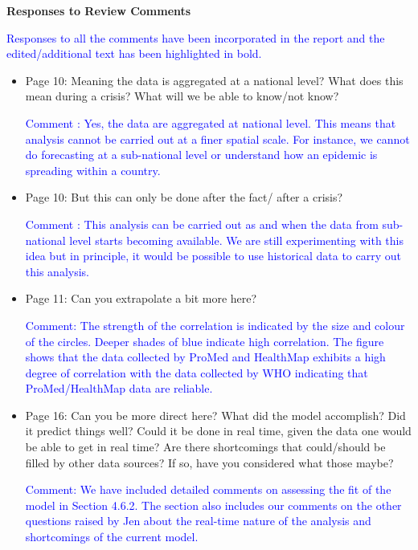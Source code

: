 \documentclass[a4paper,12pt]{article}
\def\sb#1{\textcolor{blue}{#1}}
\begin{document}
\begin{center}
 \textbf{\large Responses to Review Comments}
\end{center}

\sb{Responses to all the comments have been incorporated in the report and the
edited/additional text has been highlighted in bold.}

\begin{itemize}
\item[] Page 10: Meaning the data is aggregated at a national level? What does this mean during a crisis? What will we be able to know/not know?
 

\sb{Comment : Yes, the data are aggregated at national level. This means that analysis cannot be carried out at a finer spatial scale. For instance, we cannot do forecasting at a sub-national level or understand how an epidemic is spreading within a country.}
 

\item[] Page 10: But this can only be done after the fact/ after a crisis?

\sb{Comment : This analysis can be carried out as and when the data from sub-national level starts becoming available. We are still experimenting with this idea but in principle, it would be possible to use historical data to carry out this analysis.}
 

\item[] Page 11: Can you extrapolate a bit more here? 

\sb{Comment: The strength of the correlation is indicated by the size and colour of the circles. Deeper shades of blue indicate high correlation. The figure shows that the data collected by ProMed and HealthMap exhibits a high degree of correlation with the data collected by WHO indicating that ProMed/HealthMap data are reliable.}
 

\item[] Page 16: Can you be more direct here? What did the model accomplish?
Did it predict things well? Could it be done in real time, given the
data one would be able to get in real time? Are there shortcomings that could/should be filled by other data sources? If so, have you considered what those maybe?
 
\sb{Comment: We have included detailed comments on assessing the fit of
the model in Section 4.6.2. The section also includes our comments on
the other questions raised by Jen about the real-time nature of the analysis and
shortcomings of the current model.}
\end{itemize}
\end{document}
